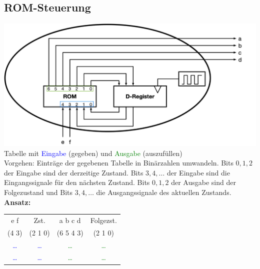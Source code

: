 \documentclass[ngerman, threecolumn, 8pt]{latex4ei/latex4ei_sheet}
\begin{document}
\begin{sectionbox}
\subsection{ROM-Steuerung}
\includegraphics[width=.85\linewidth]{img/ROM-Steuerung.jpg} \\
Tabelle mit \textcolor{blue}{Eingabe} (gegeben) und \textcolor{green}{Ausgabe} (auszufüllen) \\
Vorgehen: Einträge der gegebenen Tabelle in Binärzahlen umwandeln. Bits $0, 1, 2$ der Eingabe sind der derzeitige Zustand. Bits $3, 4, \dots$ der Eingabe sind die Eingangssignale für den nächsten Zustand. Bits $0, 1, 2$ der Ausgabe sind der Folgezustand und Bits $3, 4, \dots$ die Ausgangssignale des aktuellen Zustands.\\
\textbf{Ansatz:} \\
\begin{tabular}{c c|c c}
e f & Zst. & a b c d & Folgezst.\\
(4 3) & (2 1 0) & (6 5 4 3) & (2 1 0) \\ \hline
\textcolor{blue}{\dots} &  \textcolor{blue}{\dots} & \textcolor{green}{\dots} & \textcolor{green}{\dots} \\
 \textcolor{blue}{\dots} &  \textcolor{blue}{\dots} & \textcolor{green}{\dots} & \textcolor{green}{\dots} \\
\end{tabular}
\end{sectionbox}
\end{document}
